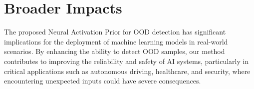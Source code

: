 \section*{Broader Impacts}
The proposed Neural Activation Prior for OOD detection has significant implications for the deployment of machine learning models in real-world scenarios. By enhancing the ability to detect OOD samples, our method contributes to improving the reliability and safety of AI systems, particularly in critical applications such as autonomous driving, healthcare, and security, where encountering unexpected inputs could have severe consequences.